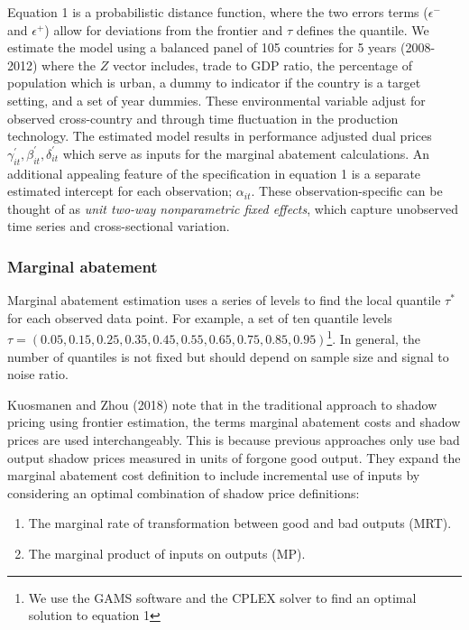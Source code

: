 \documentclass[
  10pt,
]{article}
\providecommand{\tightlist}{%
  \setlength{\itemsep}{0pt}\setlength{\parskip}{0pt}}
\begin{document}
Equation 1 is a probabilistic distance function, where the two errors
terms (\(\epsilon^-\) and \(\epsilon^+\)) allow for deviations from the
frontier and \(\tau\) defines the quantile. We estimate the model using
a balanced panel of 105 countries for 5 years (2008-2012) where the
\(Z\) vector includes, trade to GDP ratio, the percentage of population
which is urban, a dummy to indicator if the country is a target setting,
and a set of year dummies. These environmental variable adjust for
observed cross-country and through time fluctuation in the production
technology. The estimated model results in performance adjusted dual
prices \(\gamma^{'}_{it},\beta^{'}_{it} ,\delta^{'}_{it}\) which serve
as inputs for the marginal abatement calculations. An additional
appealing feature of the specification in equation 1 is a separate
estimated intercept for each observation; \(\alpha_{it}\). These
observation-specific can be thought of as \emph{unit two-way
nonparametric fixed effects}, which capture unobserved time series and
cross-sectional variation.

\hypertarget{marginal-abatement}{%
\subsubsection{Marginal abatement}\label{marginal-abatement}}

Marginal abatement estimation uses a series of levels to find the local
quantile \(\tau^{*}\) for each observed data point. For example, a set
of ten quantile levels
\(\tau=(0.05,0.15,0.25,0.35,0.45,0.55,0.65,0.75,0.85,0.95)\)\footnote{We
  use the GAMS software and the CPLEX solver to find an optimal solution
  to equation 1}. In general, the number of quantiles is not fixed but
should depend on sample size and signal to noise ratio.

Kuosmanen and Zhou (2018) note that in the traditional approach to
shadow pricing using frontier estimation, the terms marginal abatement
costs and shadow prices are used interchangeably. This is because
previous approaches only use bad output shadow prices measured in units
of forgone good output. They expand the marginal abatement cost
definition to include incremental use of inputs by considering an
optimal combination of shadow price definitions:

\begin{enumerate}
\def\labelenumi{\arabic{enumi}.}
\tightlist
\item
  The marginal rate of transformation between good and bad outputs
  (MRT).\\
\item
  The marginal product of inputs on outputs (MP).
\end{enumerate}
\end{document}
